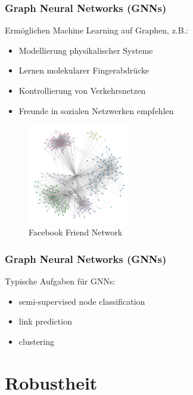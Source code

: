 \documentclass{beamer}
\begin{document}
\begin{frame}
  \frametitle{Graph Neural Networks (GNNs)}
  Ermöglichen Machine Learning auf Graphen, z.B.:
  \begin{itemize}
    \item Modellierung physikalischer Systeme
    \item Lernen molekularer Fingerabdrücke
    \item Kontrollierung von Verkehrsnetzen
    \item Freunde in sozialen Netzwerken empfehlen
  \end{itemize}
  \begin{figure}
    \centering
    \includegraphics[width=0.4\textwidth]{img/social_graph.png}
    \caption*{Facebook Friend Network \cite{}}
  \end{figure}
\end{frame}

\begin{frame}
  \frametitle{Graph Neural Networks (GNNs)}
  Typische Aufgaben für GNNs:
  \begin{itemize}
    \item semi-supervised node classification
    \item link prediction
    \item clustering
  \end{itemize}

\end{frame}

\section{Robustheit}
\end{document}
